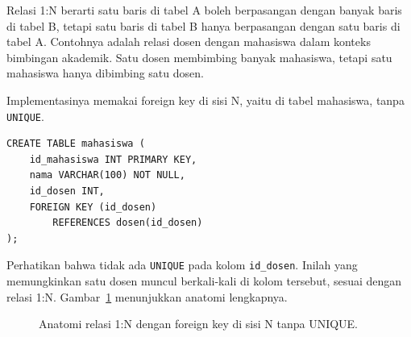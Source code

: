 \documentclass[11pt,a4paper]{article}
\begin{document}
Relasi 1:N berarti satu baris di tabel A boleh berpasangan dengan banyak baris di tabel B, tetapi satu baris di tabel B hanya berpasangan dengan satu baris di tabel A. Contohnya adalah relasi dosen dengan mahasiswa dalam konteks bimbingan akademik. Satu dosen membimbing banyak mahasiswa, tetapi satu mahasiswa hanya dibimbing satu dosen.

Implementasinya memakai foreign key di sisi N, yaitu di tabel mahasiswa, tanpa \texttt{UNIQUE}.

\begin{lstlisting}[style=code]
CREATE TABLE mahasiswa (
    id_mahasiswa INT PRIMARY KEY,
    nama VARCHAR(100) NOT NULL,
    id_dosen INT,
    FOREIGN KEY (id_dosen)
        REFERENCES dosen(id_dosen)
);
\end{lstlisting}

Perhatikan bahwa tidak ada \texttt{UNIQUE} pada kolom \texttt{id\_dosen}. Inilah yang memungkinkan satu dosen muncul berkali-kali di kolom tersebut, sesuai dengan relasi 1:N. Gambar~\ref{fig:one-n} menunjukkan anatomi lengkapnya.

\begin{figure}[H]
	\centering
	\caption{Anatomi relasi 1:N dengan foreign key di sisi N tanpa UNIQUE.}
	\label{fig:one-n}
\end{figure}
\end{document}
